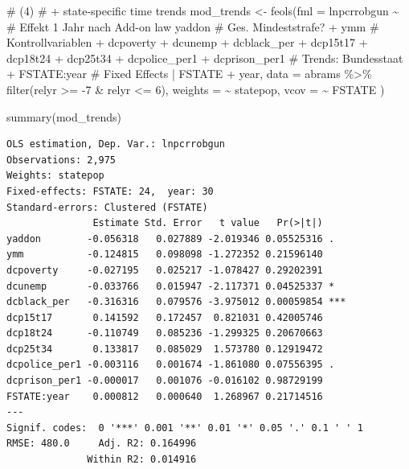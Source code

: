 \documentclass[
  a4paper,
  DIV=11,
  oneside]{scrreprt}
\newenvironment{Shaded}{\begin{snugshade}}{\end{snugshade}}
\newcommand{\AttributeTok}[1]{\textcolor[rgb]{0.40,0.45,0.13}{#1}}
\newcommand{\CommentTok}[1]{\textcolor[rgb]{0.37,0.37,0.37}{#1}}
\newcommand{\DecValTok}[1]{\textcolor[rgb]{0.68,0.00,0.00}{#1}}
\newcommand{\FunctionTok}[1]{\textcolor[rgb]{0.28,0.35,0.67}{#1}}
\newcommand{\NormalTok}[1]{\textcolor[rgb]{0.00,0.23,0.31}{#1}}
\newcommand{\OtherTok}[1]{\textcolor[rgb]{0.00,0.23,0.31}{#1}}
\newcommand{\SpecialCharTok}[1]{\textcolor[rgb]{0.37,0.37,0.37}{#1}}
\begin{document}
\begin{Shaded}
\begin{Highlighting}[]
\CommentTok{\# (4)}
\CommentTok{\# + state{-}specific time trends}
\NormalTok{mod\_trends }\OtherTok{\textless{}{-}} \FunctionTok{feols}\NormalTok{(}\AttributeTok{fml =}\NormalTok{ lnpcrrobgun }\SpecialCharTok{\textasciitilde{}}
        \CommentTok{\# Effekt 1 Jahr nach Add{-}on law              }
\NormalTok{        yaddon}
        \CommentTok{\# Ges. Mindeststrafe?}
      \SpecialCharTok{+}\NormalTok{ ymm}
        \CommentTok{\# Kontrollvariablen}
      \SpecialCharTok{+}\NormalTok{ dcpoverty}
      \SpecialCharTok{+}\NormalTok{ dcunemp}
      \SpecialCharTok{+}\NormalTok{ dcblack\_per}
      \SpecialCharTok{+}\NormalTok{ dcp15t17}
      \SpecialCharTok{+}\NormalTok{ dcp18t24 }
      \SpecialCharTok{+}\NormalTok{ dcp25t34}
      \SpecialCharTok{+}\NormalTok{ dcpolice\_per1}
      \SpecialCharTok{+}\NormalTok{ dcprison\_per1}
      \CommentTok{\# Trends: Bundesstaat}
      \SpecialCharTok{+}\NormalTok{ FSTATE}\SpecialCharTok{:}\NormalTok{year}
      \CommentTok{\# Fixed Effects}
      \SpecialCharTok{|}\NormalTok{ FSTATE }\SpecialCharTok{+}\NormalTok{ year,}
      \AttributeTok{data =}\NormalTok{ abrams }\SpecialCharTok{\%\textgreater{}\%} 
        \FunctionTok{filter}\NormalTok{(relyr }\SpecialCharTok{\textgreater{}=} \SpecialCharTok{{-}}\DecValTok{7} \SpecialCharTok{\&}\NormalTok{ relyr }\SpecialCharTok{\textless{}=} \DecValTok{6}\NormalTok{), }
      \AttributeTok{weights =} \SpecialCharTok{\textasciitilde{}}\NormalTok{ statepop,}
      \AttributeTok{vcov =} \SpecialCharTok{\textasciitilde{}}\NormalTok{ FSTATE}
\NormalTok{)}

\FunctionTok{summary}\NormalTok{(mod\_trends)}
\end{Highlighting}
\end{Shaded}

\begin{verbatim}
OLS estimation, Dep. Var.: lnpcrrobgun
Observations: 2,975
Weights: statepop
Fixed-effects: FSTATE: 24,  year: 30
Standard-errors: Clustered (FSTATE) 
               Estimate Std. Error   t value   Pr(>|t|)    
yaddon        -0.056318   0.027889 -2.019346 0.05525316 .  
ymm           -0.124815   0.098098 -1.272352 0.21596140    
dcpoverty     -0.027195   0.025217 -1.078427 0.29202391    
dcunemp       -0.033766   0.015947 -2.117371 0.04525337 *  
dcblack_per   -0.316316   0.079576 -3.975012 0.00059854 ***
dcp15t17       0.141592   0.172457  0.821031 0.42005746    
dcp18t24      -0.110749   0.085236 -1.299325 0.20670663    
dcp25t34       0.133817   0.085029  1.573780 0.12919472    
dcpolice_per1 -0.003116   0.001674 -1.861080 0.07556395 .  
dcprison_per1 -0.000017   0.001076 -0.016102 0.98729199    
FSTATE:year    0.000812   0.000640  1.268967 0.21714516    
---
Signif. codes:  0 '***' 0.001 '**' 0.01 '*' 0.05 '.' 0.1 ' ' 1
RMSE: 480.0     Adj. R2: 0.164996
              Within R2: 0.014916
\end{verbatim}
\end{document}
